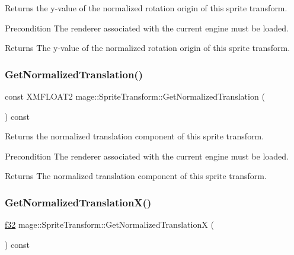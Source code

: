 Returns the y-\/value of the normalized rotation origin of this sprite transform.

\begin{DoxyPrecond}{Precondition}
The renderer associated with the current engine must be loaded. 
\end{DoxyPrecond}
\begin{DoxyReturn}{Returns}
The y-\/value of the normalized rotation origin of this sprite transform. 
\end{DoxyReturn}
\hypertarget{structmage_1_1_sprite_transform_a35b4a512d853e08743948f8065d1558f}{}\label{structmage_1_1_sprite_transform_a35b4a512d853e08743948f8065d1558f} 
\subsubsection{\texorpdfstring{Get\+Normalized\+Translation()}{GetNormalizedTranslation()}}
{\footnotesize\ttfamily const X\+M\+F\+L\+O\+A\+T2 mage\+::\+Sprite\+Transform\+::\+Get\+Normalized\+Translation (\begin{DoxyParamCaption}{ }\end{DoxyParamCaption}) const}

Returns the normalized translation component of this sprite transform.

\begin{DoxyPrecond}{Precondition}
The renderer associated with the current engine must be loaded. 
\end{DoxyPrecond}
\begin{DoxyReturn}{Returns}
The normalized translation component of this sprite transform. 
\end{DoxyReturn}
\hypertarget{structmage_1_1_sprite_transform_a01833fd1b329808dd92351ef14bc08f6}{}\label{structmage_1_1_sprite_transform_a01833fd1b329808dd92351ef14bc08f6} 
\subsubsection{\texorpdfstring{Get\+Normalized\+Translation\+X()}{GetNormalizedTranslationX()}}
{\footnotesize\ttfamily \hyperlink{namespacemage_a6a44ad388483959dc4dff9f2aef91431}{f32} mage\+::\+Sprite\+Transform\+::\+Get\+Normalized\+TranslationX (\begin{DoxyParamCaption}{ }\end{DoxyParamCaption}) const}

